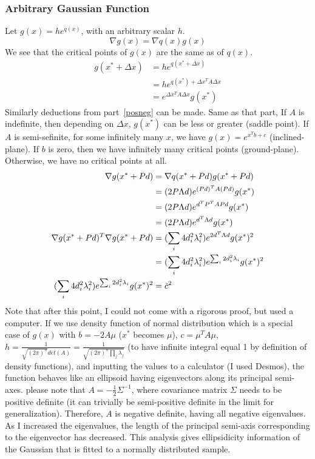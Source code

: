 \documentclass{article}
\numberwithin{equation}{subsection}
\begin{document}
\subsubsection{Arbitrary Gaussian Function}
Let $g(x) = he^{q(x)}$, with an arbitrary scalar $h$. 
\begin{equation}
    \nabla g(x) = \nabla q(x) g(x)
\end{equation}
We see that the critical points of $g(x)$ are the same as of $q(x)$. 
\begin{align}
    g(x^*+\Delta x) &= he^{q(x^*+\Delta x)}\\
     &= he^{q(x^*) + \Delta x^TA\Delta x}\\
     &= e^{\Delta x^TA\Delta x}g(x^*)
\end{align}
Similarly deductions from part~\ref{posneg} can be made. Same as that part, If $A$ is indefinite, then depending on $\Delta x$, $g(x^*)$ can be less or greater (saddle point). If $A$ is semi-sefinite, for some infinitely many $x$, we have $g(x) = e^{x^Tb+c}$ (inclined-plane). If $b$ is zero, then we have infinitely many critical points (ground-plane). Otherwise, we have no critical points at all.
\begin{align}
    \nabla g(x^*+Pd) &= \nabla q(x^*+Pd) g(x^*+Pd)\\
    &= (2P\Lambda d) e^{(Pd)^TA(Pd)}g(x^*)\\
    &= (2P\Lambda d) e^{d^TP^TAPd}g(x^*)\\
    &= (2P\Lambda d) e^{d^T\Lambda d}g(x^*)\\
    \nabla g(x^*+Pd)^T \nabla g(x^*+Pd) &= (\sum_i 4d_i^2\lambda_i^2)e^{2d^T\Lambda d}g(x^*)^2\\
    &= (\sum_i 4d_i^2\lambda_i^2)e^{\sum_i 2d_i^2\lambda_i}g(x^*)^2\\
    (\sum_i 4d_i^2\lambda_i^2)e^{\sum_i 2d_i^2\lambda_i}g(x^*)^2 &= \Tilde{c}^2
\end{align}
Note that after this point, I could not come with a rigorous proof, but used a computer.
If we use density function of normal distribution which is a special case of $g(x)$ with $b=-2A\mu$ ($x^*$ becomes $\mu$), $c=\mu^TA\mu$, $h = \frac{1}{\sqrt{(2\pi)^n}det(A)} = \frac{1}{\sqrt{(2\pi)^n\prod_j \lambda_j}}$ (to have infinite integral equal 1 by definition of density functions), and inputting the values to a calculator (I used Desmos), the function behaves like an ellipsoid having eigenvectors along its principal semi-axes. please note that $A=-\frac{1}{2}\Sigma^{-1}$, where covariance matrix $\Sigma$ needs to be positive definite (it can trivially be semi-positive definite in the limit for generalization). Therefore, $A$ is negative definite, having all negative eigenvalues. As I increased the eigenvalues, the length of the principal semi-axis corresponding to the eigenvector has decreased. 
This analysis gives ellipsidicity information of the Gaussian that is fitted to a normally distributed sample. 
\end{document}
